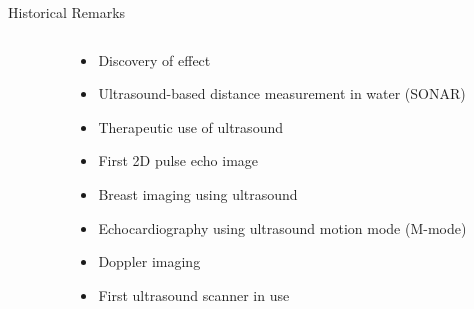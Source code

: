 \begin{frame}[c]{Historical Remarks}
    \vspace{.1cm}

    \begin{columns}[t, onlytextwidth]
        \begin{column}{0.05\textwidth}
        \end{column}\begin{column}{0.9\textwidth}
            \begin{itemize}
                \item<2->[\bluefat{1880:}] Discovery of  effect
                \item<3->[\bluefat{1920:}] Ultrasound-based distance measurement in water (SONAR)
                \item<4->[\bluefat{1933:}] Therapeutic use of ultrasound
                \item<5->[\bluefat{1952:}] First 2D pulse echo image
                \item<6->[\bluefat{1953:}] Breast imaging using ultrasound
                \item<7->[\bluefat{1957:}] Echocardiography using ultrasound motion mode (M-mode)
                \item<8->[\bluefat{1957:}] Doppler imaging
                \item<9->[\bluefat{1958:}] First ultrasound scanner in  use
            \end{itemize}
        \end{column}
    \end{columns}

\end{frame}







